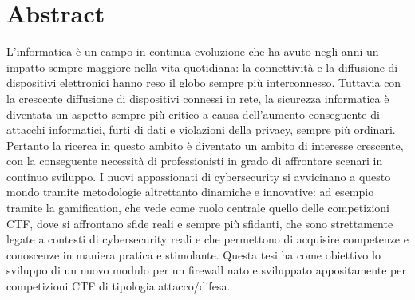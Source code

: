\chapter*{Abstract}

L'informatica è un campo in continua evoluzione che ha avuto negli anni un impatto sempre maggiore nella vita quotidiana: la connettività e la diffusione
di dispositivi elettronici hanno reso il globo sempre più interconnesso.
Tuttavia con la crescente diffusione di dispositivi connessi in rete, la sicurezza informatica è diventata un aspetto sempre più critico 
a causa dell'aumento conseguente di attacchi informatici, furti di dati e violazioni della privacy, sempre più ordinari.
Pertanto la ricerca in questo ambito è diventato un ambito di interesse crescente, con la conseguente necessità di professionisti
in grado di affrontare scenari in continuo sviluppo.
I nuovi appassionati di cybersecurity si avvicinano a questo mondo tramite metodologie altrettanto dinamiche e innovative:
ad esempio tramite la gamification, che vede come ruolo centrale quello delle competizioni CTF, dove si affrontano sfide reali e sempre più sfidanti,
che sono strettamente legate a contesti di cybersecurity reali e che permettono di acquisire competenze e conoscenze in maniera pratica e stimolante.
Questa tesi ha come obiettivo lo sviluppo di un nuovo modulo per un firewall nato e sviluppato appositamente per competizioni CTF di tipologia attacco/difesa.
